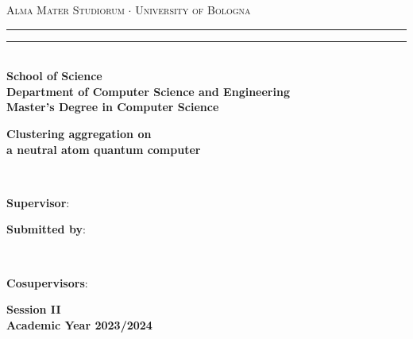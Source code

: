\begin{titlepage}
  \begin{center}
      {{\Large{\textsc{Alma Mater Studiorum $\cdot$ University of Bologna}}}}
      \rule[0.1cm]{\textwidth}{0.1mm}
      \rule[0.5cm]{\textwidth}{0.6mm}\\
      {\small{\bf School of Science\\
      Department of Computer Science and Engineering\\
      Master's Degree in Computer Science}}
  \end{center}
  
  \vspace{25mm}
  
  \begin{center}
      
      {\LARGE{\bf Clustering aggregation on}}\\
      \vspace{3mm}
      {\LARGE{\bf a neutral atom quantum computer}}\\
  \end{center}
  
  \vspace{60mm}
  \par
  \noindent
  \begin{minipage}[t]{0.04\textwidth}
  ~
  \end{minipage}
  \begin{minipage}[t]{0.4\textwidth}
  {\large{\textbf{Supervisor}:\\
  \supname
  }}
  \end{minipage}
  \hfill
  \begin{minipage}[t]{0.4\textwidth}\raggedleft
  {\large{\textbf{Submitted by}:\\
  \authorname}}
  \end{minipage}
  \begin{minipage}[t]{0.04\textwidth}
  ~
  \end{minipage}
  
  \vspace{10mm}
  \begin{minipage}[t]{0.4\textwidth}
  \large{\textbf{Cosupervisors}:\\
  \cosupname}
  \end{minipage}
  
  \vspace{30mm}
  
  \begin{center}
      {\large{\bf Session II\\
      Academic Year 2023/2024 }}
  \end{center}
  \end{titlepage}